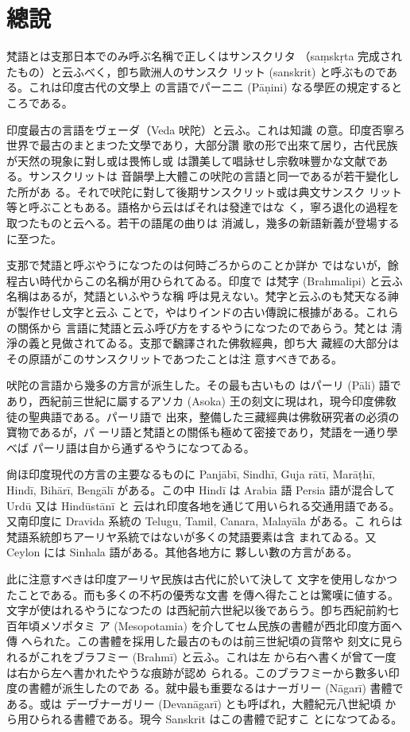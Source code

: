 \chapter*{總說}
\label{cha:general}

\numberParagraph
梵語とは支那日本でのみ呼ぶ名稱で正しくはサンスクリタ
（saṃskṛta 完成されたもの）と云ふべく，卽ち歐洲人のサンスク
リット (sanskrit) と呼ぶものである。これは印度古代の文學上
の言語でパーニニ (Pāṇini) なる學匠の規定するところである。

印度最古の言語をヴェーダ（Veda 吠陀）と云ふ。これは知識
の意。印度否寧ろ世界で最古のまとまつた文學であり，大部分讚
歌の形で出來て居り，古代民族が天然の現象に對し或は畏怖し或
は讚美して唱詠せし宗敎味豐かな文献である。サンスクリットは
音韻學上大體この吠陀の言語と同一であるが若干變化した所があ
る。それで吠陀に對して後期サンスクリット或は典文サンスク
リット等と呼ぶこともある。語格から云はばそれは發達ではな
く，寧ろ退化の過程を取つたものと云へる。若干の語尾の曲りは
消滅し，幾多の新語新義が登場するに至つた。

支那で梵語と呼ぶやうになつたのは何時ごろからのことか詳か
ではないが，餘程古い時代からこの名稱が用ひられてゐる。印度で
は梵字 (Brahmalipi) と云ふ名稱はあるが，梵語といふやうな稱
呼は見えない。梵字と云ふのも梵天なる神が製作せし文字と云ふ
ことで，やはりインドの古い傳說に根據がある。これらの關係から
言語に梵語と云ふ呼び方をするやうになつたのであらう。梵とは
淸淨の義と見做されてゐる。支那で飜譯された佛敎經典，卽ち大
藏經の大部分はその原語がこのサンスクリットであつたことは注
意すべきである。

\numberParagraph
吠陀の言語から幾多の方言が派生した。その最も古いもの
はパーリ (Pāli) 語であり，西紀前三世紀に屬するアソカ (Asoka)
王の刻文に現はれ，現今印度佛敎徒の聖典語である。パーリ語で
出來，整備した三藏經典は佛敎硏究者の必須の寶物であるが，パ
ーリ語と梵語との關係も極めて密接であり，梵語を一通り學べば
パーリ語は自から通ずるやうになつてゐる。

尙ほ印度現代の方言の主要なるものに Panjābī, Sindhī, Guja\-%
rātī, Marāṭhī, Hindī, Bihārī, Bengālī がある。この中 Hindī
は Arabia 語 Persia 語が混合して Urdū 又は Hindūstānī と
云はれ印度各地を通じて用いられる交通用語である。又南印度に
Dravida 系統の Telugu, Tamil, Canara, Malayāla がある。こ
れらは梵語系統卽ちアーリヤ系統ではないが多くの梵語要素は含
まれてゐる。又 Ceylon には Sinhala 語がある。其他各地方に
夥しい數の方言がある。

\numberParagraph
此に注意すべきは印度アーリヤ民族は古代に於いて決して
文字を使用しなかつたことである。而も多くの不朽の優秀な文書
を傳へ得たことは驚嘆に値する。文字が使はれるやうになつたの
は西紀前六世紀以後であらう。卽ち西紀前約七百年頃メソポタミ
ア (Mesopotamia) を介してセム民族の書體が西北印度方面へ傳
へられた。この書體を採用した最古のものは前三世紀頃の貨幣や
刻文に見られるがこれをブラフミー (Brahmī) と云ふ。これは左
から右へ書くが曾て一度は右から左へ書かれたやうな痕跡が認め
られる。このブラフミーから數多い印度の書體が派生したのであ
る。就中最も重要なるはナーガリー (Nāgarī) 書體である。或は
デーヷナーガリー (Devanāgarī) とも呼ばれ，大體紀元八世紀頃
から用ひられる書體である。現今 Sanskrit はこの書體で記すこ
とになつてゐる。

